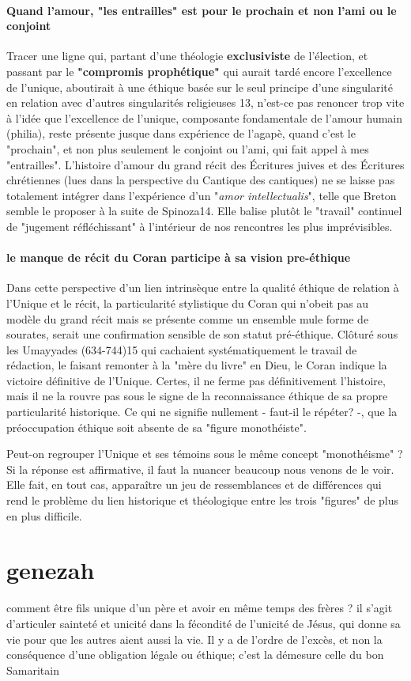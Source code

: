 \paragraph{Quand l'amour, "les entrailles" est pour le prochain et non l'ami ou le conjoint}Tracer une ligne qui, partant d'une théologie \textbf{exclusiviste} de l'élection, et passant par le \textbf{"compromis prophétique"} qui aurait tardé encore l'excellence de l'unique, aboutirait à une éthique basée sur le seul principe d'une singularité en relation avec d'autres singularités religieuses 13, n'est-ce pas renoncer trop vite à l'idée que l'excellence de l'unique, composante fondamentale de l'amour humain (philia), reste présente jusque dans expérience de l'agapè, quand c'est le "prochain", et non plus seulement le conjoint ou l'ami, qui fait appel à mes "entrailles". L'histoire d'amour du grand récit des Écritures juives et des Écritures chrétiennes (lues dans la perspective du Cantique des cantiques) ne se laisse pas totalement intégrer dans l’expérience d’un "\textit{amor intellectualis}", telle que Breton semble le proposer à la suite de Spinoza14. Elle balise plutôt le "travail" continuel de "jugement réfléchissant" à l'intérieur de nos rencontres les plus imprévisibles. 

\paragraph{le manque de récit du Coran participe à sa vision pre-éthique} Dans cette perspective d'un lien intrinsèque entre la qualité éthique de relation à l'Unique et le récit, la particularité stylistique du Coran qui n'obeit pas au modèle du grand récit mais se présente comme un ensemble mule forme de sourates, serait une confirmation sensible de son statut pré-éthique.
Clôturé sous les Umayyades (634-744)15 qui cachaient systématiquement le travail de rédaction, le faisant remonter à la "mère du livre" en Dieu, le Coran indique la victoire définitive de l'Unique. Certes, il ne ferme pas définitivement l'histoire, mais il ne la rouvre pas sous le signe de la reconnaissance éthique de sa propre particularité historique. Ce qui ne signifie nullement - faut-il le répéter? -, que la préoccupation éthique soit absente de sa "figure monothéiste".

Peut-on regrouper l'Unique et ses témoins sous le même concept "monothéisme" ? Si la réponse est affirmative, il faut la nuancer beaucoup nous venons de le voir. Elle fait, en tout cas, apparaître un jeu de ressemblances et de différences qui rend le problème du lien historique et théologique entre les trois "figures" de plus en plus difficile.
\section{genezah}

comment être fils unique d'un père et avoir en même temps des frères ? il s'agit d'articuler sainteté  et unicité dans la fécondité de l'unicité de Jésus, qui donne sa vie pour que les autres aient aussi la vie. Il y a de l'ordre de l'excès,  et non la conséquence d'une obligation légale ou éthique; c'est la démesure celle du bon Samaritain
